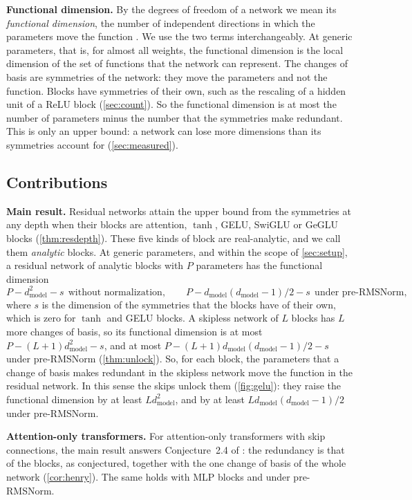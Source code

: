 \documentclass[10pt]{article}
\theoremstyle{definition}
\theoremstyle{remark}
\newcommand{\dm}{d_{\mathrm{model}}}
\newcommand{\para}[1]{\smallskip\noindent\textbf{#1}\hspace{0.5em}}
\begin{document}
\para{Functional dimension.} By the degrees of freedom of a network we mean its \emph{functional dimension}, the number of independent directions in which the parameters move the function \citep{grigsby2022functional}. We use the two terms interchangeably. At generic parameters, that is, for almost all weights, the functional dimension is the local dimension of the set of functions that the network can represent. The changes of basis are symmetries of the network: they move the parameters and not the function. Blocks have symmetries of their own, such as the rescaling of a hidden unit of a ReLU block (\cref{sec:count}). So the functional dimension is at most the number of parameters minus the number that the symmetries make redundant. This is only an upper bound: a network can lose more dimensions than its symmetries account for (\cref{sec:measured}).

\subsection{Contributions}\label{sec:contributions}

\para{Main result.} Residual networks attain the upper bound from the symmetries at any depth when their blocks are attention, $\tanh$, GELU, SwiGLU or GeGLU blocks (\cref{thm:resdepth}). These five kinds of block are real-analytic, and we call them \emph{analytic} blocks. At generic parameters, and within the scope of \cref{sec:setup}, a residual network of analytic blocks with $P$ parameters has the functional dimension
\[
P - \dm^2 - s \ \ \text{without normalization}, \qquad P - \dm(\dm-1)/2 - s \ \ \text{under pre-RMSNorm},
\]
where $s$ is the dimension of the symmetries that the blocks have of their own, which is zero for $\tanh$ and GELU blocks. A skipless network of $L$ blocks has $L$ more changes of basis, so its functional dimension is at most $P - (L+1)\dm^2 - s$, and at most $P - (L+1)\dm(\dm-1)/2 - s$ under pre-RMSNorm (\cref{thm:unlock}). So, for each block, the parameters that a change of basis makes redundant in the skipless network move the function in the residual network. In this sense the skips unlock them (\cref{fig:gelu}): they raise the functional dimension by at least $L\dm^2$, and by at least $L\dm(\dm-1)/2$ under pre-RMSNorm.

\para{Attention-only transformers.} For attention-only transformers with skip connections, the main result answers Conjecture~2.4 of \citet{henry2026generic}: the redundancy is that of the blocks, as conjectured, together with the one change of basis of the whole network (\cref{cor:henry}). The same holds with MLP blocks and under pre-RMSNorm.
\end{document}
